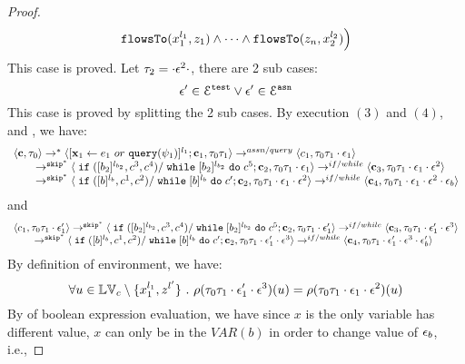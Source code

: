 \begin{proof}
\[  \mathtt{flowsTo}(x_1^{l_1}, z_1) 
  \land \cdots \land \mathtt{flowsTo}(z_n, x_2^{l_2}) \Big)
 \]
 This case is proved.
%
 Let $\mathtt{\tau}_2 = \cdot \mathtt{\epsilon}^2 \cdot$, there are 2 sub cases: 
 \[
 \mathtt{\epsilon}' \in \mathcal{E}^{\mathtt{{test}}} \lor \mathtt{\epsilon}' \in \mathcal{E}^{\mathtt{{asn}}}
 \]
 This case is proved by splitting the 2 sub cases.
 \subcaseL{$\event^2 \in \eventset^{\test}$}
By execution $(3)$ and $(4)$, and , we have:
\[
  \begin{array}{l}   
  \langle {\boldsymbol{\mathbf{c}}}, \mathtt{\tau}_0 \rangle 
  \rightarrow^{*} 
  \langle [\mathrel{ {\boldsymbol{\mathbf{x}}}_1 \leftarrow e_1~ or ~ {\tt query}(\psi_1) }]^{l_1} ; {\boldsymbol{\mathbf{c}}}_1, \mathtt{\tau}_0 \mathtt{\tau}_1 \rangle  \rightarrow^{assn/query}
 \langle c_1, \mathtt{\tau}_0 \mathtt{\tau}_1 \cdot \mathtt{\epsilon}_1 \rangle 
  \\ 
  \qquad \rightarrow^{\mathtt{skip}^*} 
  \langle \;\mathtt{if}\;([b_2]{}^{l_{b_2}}, c^3, c^4) / \;\mathtt{while}\; [b_2]{}^{l_{b_2}} \;\mathtt{do}\; c^5; {\boldsymbol{\mathbf{c}}}_2, 
  \mathtt{\tau}_0 \mathtt{\tau}_1 \cdot \mathtt{\epsilon}_1 \rangle 
  \rightarrow^{if / while} 
  \langle {\boldsymbol{\mathbf{c}}}_3,  \mathtt{\tau}_0 \mathtt{\tau}_1 \cdot \mathtt{\epsilon}_1 \cdot \mathtt{\epsilon}^2 \rangle 
  \\ 
  \qquad \rightarrow^{\mathtt{skip}^*} 
  \langle \;\mathtt{if}\;([b]{}^{l_b}, c^1, c^2) / \;\mathtt{while}\; [b]{}^{l_b} \;\mathtt{do}\; c'; {\boldsymbol{\mathbf{c}}}_2, 
  \mathtt{\tau}_0 \mathtt{\tau}_1 \cdot \mathtt{\epsilon}_1\cdot \mathtt{\epsilon}^2 \rangle 
  \rightarrow^{if / while} 
  \langle {\boldsymbol{\mathbf{c}}}_4,  \mathtt{\tau}_0 \mathtt{\tau}_1 \cdot \mathtt{\epsilon}_1 \cdot \mathtt{\epsilon}^2 \cdot \mathtt{\epsilon}_b \rangle 
\end{array}
 \]
and 
 \[
  \begin{array}{l}   
  \langle c_1, \mathtt{\tau}_0 \mathtt{\tau}_1 \cdot \mathtt{\epsilon}_1' \rangle 
 \rightarrow^{\mathtt{skip}^*} 
  \langle \;\mathtt{if}\;([b_2]{}^{l_{b_2}}, c^3, c^4) / \;\mathtt{while}\; [b_2]{}^{l_{b_2}} \;\mathtt{do}\; c^5; {\boldsymbol{\mathbf{c}}}_2, 
  \mathtt{\tau}_0 \mathtt{\tau}_1 \cdot \mathtt{\epsilon}_1' \rangle 
  \rightarrow^{if / while} 
  \langle {\boldsymbol{\mathbf{c}}}_3,  \mathtt{\tau}_0 \mathtt{\tau}_1 \cdot \mathtt{\epsilon}_1' \cdot \mathtt{\epsilon}^3 \rangle 
  \\ 
  \qquad \rightarrow^{\mathtt{skip}^*} 
  \langle \;\mathtt{if}\;([b]{}^{l_b}, c^1, c^2) / \;\mathtt{while}\; [b]{}^{l_b} \;\mathtt{do}\; c'; {\boldsymbol{\mathbf{c}}}_2, 
  \mathtt{\tau}_0 \mathtt{\tau}_1 \cdot \mathtt{\epsilon}_1' \cdot \mathtt{\epsilon}^3 \rangle 
  \rightarrow^{if / while} 
  \langle {\boldsymbol{\mathbf{c}}}_4,  \mathtt{\tau}_0 \mathtt{\tau}_1 \cdot \mathtt{\epsilon}_1' \cdot \mathtt{\epsilon}^3 \cdot \mathtt{\epsilon}_b' \rangle 
\end{array}
 \]
 By definition of environment, we have:
\[
  \forall u \in \mathbb{LV}_c \setminus \{x_1^{l_1}, z^{l'}\} ~.~
  \rho(\mathtt{\tau}_0 \mathtt{\tau}_1 \cdot \mathtt{\epsilon}_1' \cdot \mathtt{\epsilon}^3) (u) =  
  \rho(\mathtt{\tau}_0 \mathtt{\tau}_1 \cdot \mathtt{\epsilon}_1 \cdot \mathtt{\epsilon}^2) (u)
\]
%
By  of boolean expression evaluation, we have since $x$ is the only variable has different value, $x$ can only be in the $VAR(b)$ in order to change value of $\mathtt{\epsilon}_b$, i.e.,

\end{proof}
